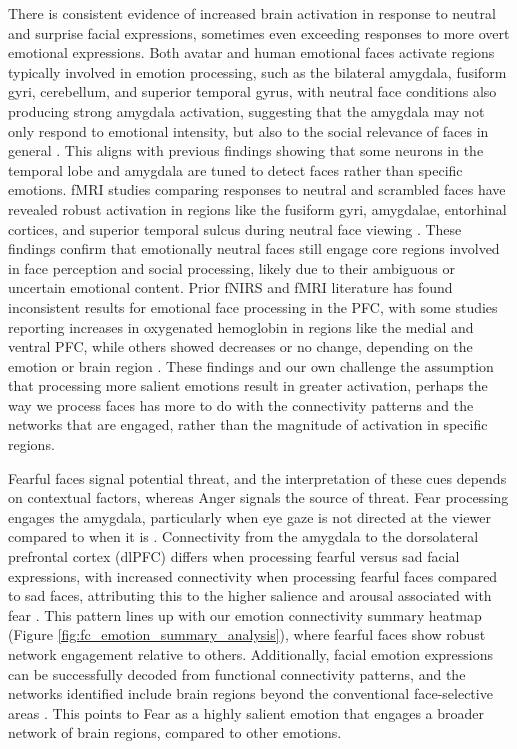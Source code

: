 There is consistent evidence of increased brain activation in response to neutral and surprise facial expressions, sometimes even exceeding responses to more overt emotional expressions.
Both avatar and human emotional faces activate regions typically involved in emotion processing, such as the bilateral amygdala, fusiform gyri, cerebellum, and superior temporal gyrus, with neutral face conditions also producing strong amygdala activation, suggesting that the amygdala may not only respond to emotional intensity, but also to the social relevance of faces in general \citep{moser_amygdala_2007}. 
This aligns with previous findings showing that some neurons in the temporal lobe and amygdala are tuned to detect faces rather than specific emotions.
fMRI studies comparing responses to neutral and scrambled faces have revealed robust activation in regions like the fusiform gyri, amygdalae, entorhinal cortices, and superior temporal sulcus during neutral face viewing \citep{keslerwest_neural_2001}. 
These findings confirm that emotionally neutral faces still engage core regions involved in face perception and social processing, likely due to their ambiguous or uncertain emotional content.
Prior fNIRS and fMRI literature has found inconsistent results for emotional face processing in the PFC, with some studies reporting increases in oxygenated hemoglobin in regions like the medial and ventral PFC, while others showed decreases or no change, depending on the emotion or brain region \citep{westgarth_systematic_2021}. 
These findings and our own challenge the assumption that processing more salient emotions result in greater activation, perhaps the way we process faces has more to do with the connectivity patterns and the networks that are engaged, rather than the magnitude of activation in specific regions.

Fearful faces signal potential threat, and the interpretation of these cues depends on contextual factors, whereas Anger signals the source of threat. 
Fear processing engages the amygdala, particularly when eye gaze is not directed at the viewer compared to when it is \citep{cushing_neurodynamics_2018}.
Connectivity from the amygdala to the dorsolateral prefrontal cortex (dlPFC) differs when processing fearful versus sad facial expressions, with increased connectivity when processing fearful faces compared to sad faces, attributing this to the higher salience and arousal associated with fear \citep{jamieson_differential_2021, adolphs_biology_2013}.
This pattern lines up with our emotion connectivity summary heatmap (Figure \ref{fig:fc_emotion_summary_analysis}), where fearful faces show robust network engagement relative to others. 
Additionally, facial emotion expressions can be successfully decoded from functional connectivity patterns, and the networks identified include brain regions beyond the conventional face-selective areas \citep{liang_multivariate_2018}. 
This points to Fear as a highly salient emotion that engages a broader network of brain regions, compared to other emotions. 

